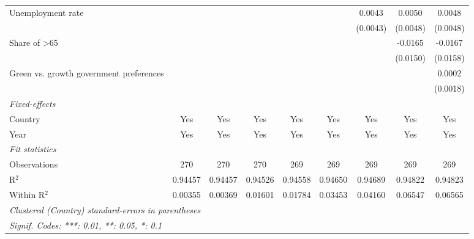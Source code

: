 \begin{table}[htbp]
\begin{tabular}{lcccccccc}
      Unemployment rate                                        &          &          &          &          &                        & 0.0043   & 0.0050   & 0.0048\\   
                                                               &          &          &          &          &                        & (0.0043) & (0.0048) & (0.0048)\\   
      Share of >65                                             &          &          &          &          &                        &          & -0.0165  & -0.0167\\   
                                                               &          &          &          &          &                        &          & (0.0150) & (0.0158)\\   
      Green vs. growth government preferences                  &          &          &          &          &                        &          &          & 0.0002\\   
                                                               &          &          &          &          &                        &          &          & (0.0018)\\   
      \midrule
      \emph{Fixed-effects}\\
      Country                                                  & Yes      & Yes      & Yes      & Yes      & Yes                    & Yes      & Yes      & Yes\\  
      Year                                                     & Yes      & Yes      & Yes      & Yes      & Yes                    & Yes      & Yes      & Yes\\  
      \midrule
      \emph{Fit statistics}\\
      Observations                                             & 270      & 270      & 270      & 269      & 269                    & 269      & 269      & 269\\  
      R$^2$                                                    & 0.94457  & 0.94457  & 0.94526  & 0.94558  & 0.94650                & 0.94689  & 0.94822  & 0.94823\\  
      Within R$^2$                                             & 0.00355  & 0.00369  & 0.01601  & 0.01784  & 0.03453                & 0.04160  & 0.06547  & 0.06565\\  
      \midrule \midrule
      \multicolumn{9}{l}{\emph{Clustered (Country) standard-errors in parentheses}}\\
      \multicolumn{9}{l}{\emph{Signif. Codes: ***: 0.01, **: 0.05, *: 0.1}}\\
   \end{tabular}
\end{table}


